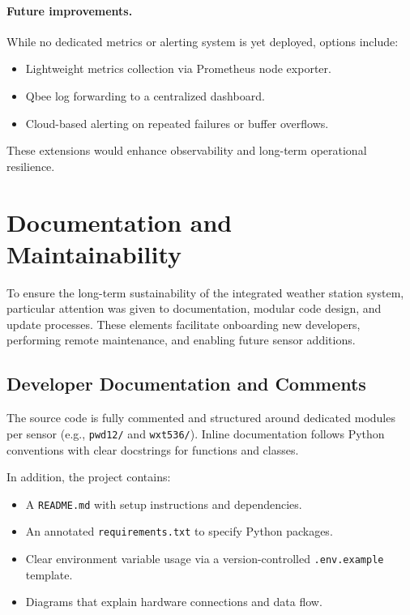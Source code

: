 \paragraph{Future improvements.}
While no dedicated metrics or alerting system is yet deployed, options include:
\begin{itemize}
    \item Lightweight metrics collection via Prometheus node exporter.
    \item Qbee log forwarding to a centralized dashboard.
    \item Cloud-based alerting on repeated failures or buffer overflows.
\end{itemize}

These extensions would enhance observability and long-term operational resilience.


\section{Documentation and Maintainability}
\label{sec:documentation-maintainability}

To ensure the long-term sustainability of the integrated weather station system, particular attention was given to documentation, modular code design, and update processes. These elements facilitate onboarding new developers, performing remote maintenance, and enabling future sensor additions.


\subsection{Developer Documentation and Comments}

The source code is fully commented and structured around dedicated modules per sensor (e.g., \texttt{pwd12/} and \texttt{wxt536/}). Inline documentation follows Python conventions with clear docstrings for functions and classes.

In addition, the project contains:
\begin{itemize}
    \item A \texttt{README.md} with setup instructions and dependencies.
    \item An annotated \texttt{requirements.txt} to specify Python packages.
    \item Clear environment variable usage via a version-controlled \texttt{.env.example} template.
    \item Diagrams that explain hardware connections and data flow.
\end{itemize}

